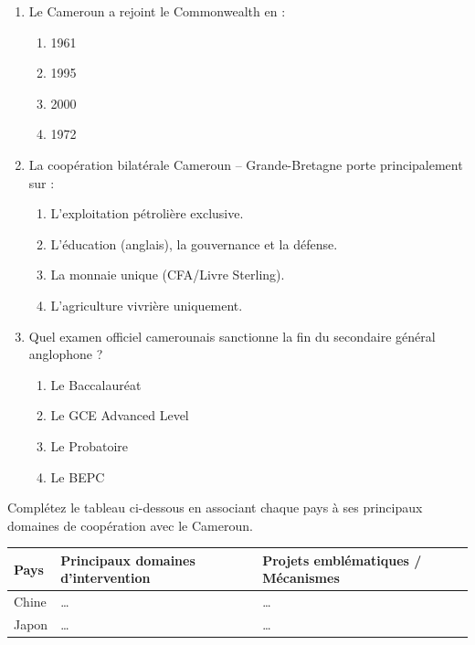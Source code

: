 \documentclass[11pt]{article}
\begin{document}
\begin{exercice}
\begin{enumerate}
    \item Le Cameroun a rejoint le Commonwealth en :
    \begin{enumerate}
        \item 1961 \item 1995 \item 2000 \item 1972
    \end{enumerate}
    \item La coopération bilatérale Cameroun -- Grande-Bretagne porte principalement sur :
    \begin{enumerate}
        \item L'exploitation pétrolière exclusive.
        \item L'éducation (anglais), la gouvernance et la défense.
        \item La monnaie unique (CFA/Livre Sterling).
        \item L'agriculture vivrière uniquement.
    \end{enumerate}
    \item Quel examen officiel camerounais sanctionne la fin du secondaire général anglophone ?
    \begin{enumerate}
        \item Le Baccalauréat \item Le GCE Advanced Level \item Le Probatoire \item Le BEPC
    \end{enumerate}
\end{enumerate}
\end{exercice}

\begin{exercice}
Complétez le tableau ci-dessous en associant chaque pays à ses principaux domaines de coopération avec le Cameroun.

\begin{tabular}{|p{2.5cm}|p{5.5cm}|p{5.5cm}|}
\hline
\textbf{Pays} & \textbf{Principaux domaines d'intervention} & \textbf{Projets emblématiques / Mécanismes} \\ \hline
Chine & \ldots & \ldots \\ \hline
Japon & \ldots & \ldots \\ \hline
\end{tabular}
\end{exercice}
\end{document}
